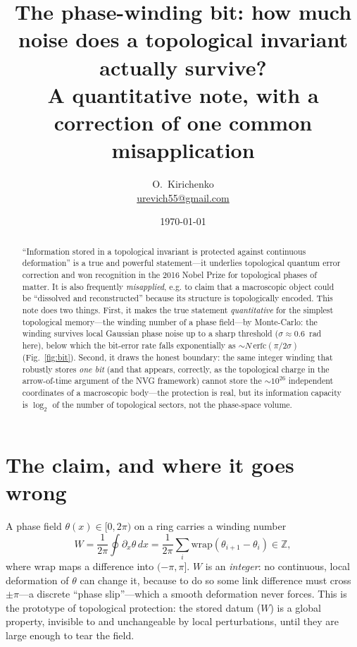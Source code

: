 \documentclass[11pt,a4paper]{article}
\title{\textbf{The phase-winding bit: how much noise does a topological
invariant actually survive?}\\[3pt]
\large A quantitative note, with a correction of one common misapplication}
\author{O.~Kirichenko\\[2pt]\small
  \href{mailto:urevich55@gmail.com}{urevich55@gmail.com}}
\date{\today}
\begin{document}
\maketitle

\begin{abstract}\noindent
``Information stored in a topological invariant is protected against
continuous deformation'' is a true and powerful statement---it underlies
topological quantum error correction and won recognition in the 2016
Nobel Prize for topological phases of matter. It is also frequently
\emph{misapplied}, e.g. to claim that a macroscopic object could be
``dissolved and reconstructed'' because its structure is topologically
encoded. This note does two things. First, it makes the true statement
\emph{quantitative} for the simplest topological memory---the winding
number of a phase field---by Monte-Carlo: the winding survives local
Gaussian phase noise up to a sharp threshold ($\sigma\!\approx\!0.6$~rad
here), below which the bit-error rate falls exponentially as
$\sim\!N\,\mathrm{erfc}(\pi/2\sigma)$ (Fig.~\ref{fig:bit}). Second, it
draws the honest boundary: the same integer winding that robustly stores
\emph{one bit} (and that appears, correctly, as the topological charge in
the arrow-of-time argument of the NVG framework) cannot store the
$\sim\!10^{26}$ independent coordinates of a macroscopic body---the
protection is real, but its information capacity is $\log_2$ of the number
of topological sectors, not the phase-space volume.
\end{abstract}

\section{The claim, and where it goes wrong}
A phase field $\theta(x)\in[0,2\pi)$ on a ring carries a winding number
\begin{equation}
  W = \frac{1}{2\pi}\oint \partial_x\theta\,dx
    = \frac{1}{2\pi}\sum_i \mathrm{wrap}(\theta_{i+1}-\theta_i)
    \in\mathbb{Z},
\end{equation}
where $\mathrm{wrap}$ maps a difference into $(-\pi,\pi]$. $W$ is an
\emph{integer}: no continuous, local deformation of $\theta$ can change it,
because to do so some link difference must cross $\pm\pi$---a discrete
``phase slip''---which a smooth deformation never forces. This is the
prototype of topological protection: the stored datum ($W$) is a global
property, invisible to and unchangeable by local perturbations, until they
are large enough to tear the field.
\end{document}
